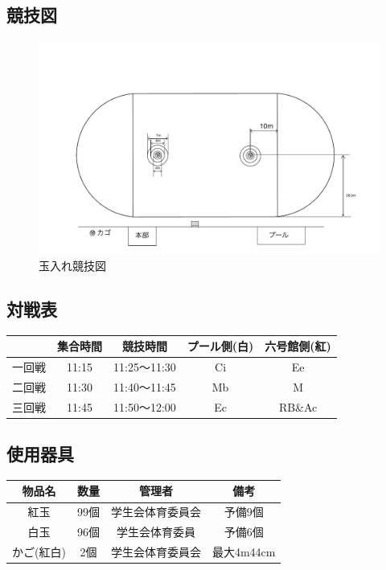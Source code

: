 \documentclass[titlepage]{jarticle}
\begin{document}
  \subsection{競技図}
   \begin{figure}[H]
    \centering
    \includegraphics[width=12cm]{ballin2.pdf}
    \caption{玉入れ競技図}
   \end{figure}
  \subsection{対戦表}
   \begin{table}[H]
    \begin{tabular}{ccccc}
     &集合時間&競技時間&プール側(白)&六号館側(紅)\\ \hline\hline
     一回戦&11:15&11:25～11:30&Ci&Ee\\
     二回戦&11:30&11:40～11:45&Mb&M\\
     三回戦&11:45&11:50～12:00&Ec&RB\&Ac\\
    \end{tabular}
   \end{table}
  \subsection{使用器具}
   \begin{table}[H]
    \begin{tabular}{cccc}
     物品名&数量&管理者 &備考\\ \hline\hline
紅玉&99個&学生会体育委員会&予備9個\\
白玉&96個&学生会体育委員&予備6個\\
かご(紅白)&2個&学生会体育委員会&最大4m44cm\\
    \end{tabular}
   \end{table}
\end{document}
